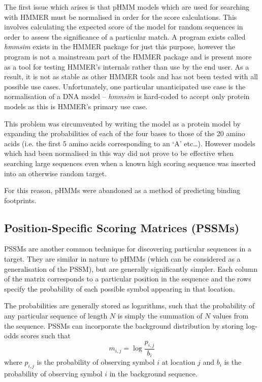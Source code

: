 The first issue which arises is that pHMM models which are used for searching
with HMMER must be normalised in order for the score calculations.
This involves calculating the expected score of the model for random sequences
in order to assess the significance of a particular match.
A program exists called \emph{hmmsim} exists in the HMMER package for just 
this purpose, however the program is not a mainstream part of the HMMER package
and is present more as a tool for testing HMMER's internals rather than use by
the end user.
As a result, it is not as stable as other HMMER tools and has not been tested
with all possible use cases.
Unfortunately, one particular unanticipated use case is the normalisation of a
DNA model -- \emph{hmmsim} is hard-coded to accept only protein models as this
is HMMER's primary use case.

This problem was circumvented by writing the model as a protein model by
expanding the probabilities of each of the four bases to those of the 20 
amino acids (i.e. the first 5 amino acids corresponding to an `A' etc\ldots).
However models which had been normalised in this way did not prove to be
effective when searching large sequences even when a known high scoring
sequence was inserted into an otherwise random target.

For this reason, pHMMs were abandoned as a method of predicting binding
footprints.


\subsection{Position-Specific Scoring Matrices (PSSMs)}
\label{sec:pssm_binding}

PSSMs are another common technique for discovering particular sequences in a
target.
They are similar in nature to pHMMs (which can be considered as a
generalisation of the PSSM), but are generally significantly simpler.
Each column of the matrix corresponds to a particular position in the sequence and
the rows specify the probability of each possible symbol appearing in that
location.

The probabilities are generally stored as logarithms, such that the probability
of any particular sequence of length $N$ is simply the summation of $N$ values
from the sequence.
PSSMs can incorporate the background distribution by storing log-odds scores
such that
\begin{equation*}
  m_{i,j} = \log {\frac{p_{i,j}}{b_i}}
\end{equation*}
where $p_{i,j}$ is the probability of observing symbol $i$ at location $j$ and
$b_i$ is the probability of observing symbol $i$ in the background sequence.

